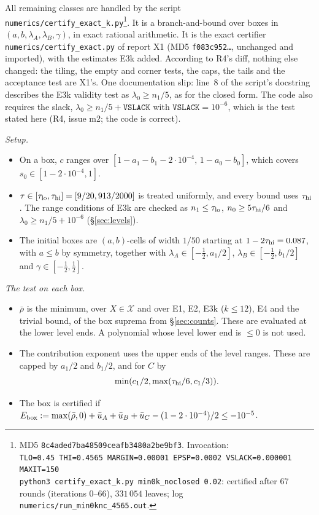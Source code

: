 \documentclass[11pt]{amsart}
\theoremstyle{definition}
\theoremstyle{remark}
\newcommand{\cX}{\mathcal{X}}
\begin{document}
All remaining classes are handled by the script\\ \texttt{numerics/certify\_exact\_k.py}\footnote{MD5 \texttt{8c4aded7ba48509ceafb3480a2be9bf3}. Invocation:\\
{\footnotesize\texttt{TLO=0.45 THI=0.4565 MARGIN=0.00001 EPSP=0.0002 VSLACK=0.000001 MAXIT=150}}\\
{\footnotesize\texttt{python3 certify\_exact\_k.py min0k\_noclosed 0.02}}: certified after 67 rounds (iterations 0--66), $331\,054$ leaves;
log \texttt{numerics/run\_min0knc\_4565.out}.}.
It is a branch-and-bound over boxes in $(a,b,\lambda_A,\lambda_B,\gamma)$, in exact rational arithmetic. It is the exact certifier
\texttt{numerics/certify\_exact.py} of report X1 (MD5 \texttt{f083c952\dots}, unchanged and imported), with the estimates E3k added.
According to R4's diff, nothing else changed: the tiling, the empty and corner tests, the caps, the tails and the acceptance test are X1's.
One documentation slip: line~8 of the script's docstring describes the E3k validity test as $\lambda_0\ge n_1/5$, as for the closed form. The
code also requires the slack, $\lambda_0\ge n_1/5+\texttt{VSLACK}$ with $\texttt{VSLACK}=10^{-6}$, which is the test stated here (R4, issue m2; the code is correct).

\emph{Setup.}
\begin{itemize}[leftmargin=*]
\item On a box, $c$ ranges over $[1-a_1-b_1-2\cdot10^{-4},\,1-a_0-b_0]$, which covers $s_0\in[1-2\cdot10^{-4},1]$.
\item $\tau\in[\tau_{\rm lo},\tau_{\rm hi}]=[9/20,913/2000]$ is treated uniformly, and every bound uses $\tau_{\rm hi}$. The range conditions of E3k are checked as
$n_1\le\tau_{\rm lo}$, $n_0\ge5\tau_{\rm hi}/6$ and $\lambda_0\ge n_1/5+10^{-6}$ (\S\ref{sec:levels}).
\item The initial boxes are $(a,b)$-cells of width $1/50$ starting at $1-2\tau_{\rm hi}=0.087$, with $a\le b$ by symmetry, together with
$\lambda_A\in[-\frac12,a_1/2]$, $\lambda_B\in[-\frac12,b_1/2]$ and $\gamma\in[-\frac12,\frac12]$.
\end{itemize}

\emph{The test on each box.}
\begin{itemize}[leftmargin=*]
\item $\bar\rho$ is the minimum, over $X\in\cX$ and over E1, E2, E3k ($k\le12$), E4 and the trivial bound, of the box suprema from \S\ref{sec:counts}. These are evaluated at the
lower level ends. A polynomial whose level lower end is $\le0$ is not used.
\item The contribution exponent uses the upper ends of the level ranges. These are capped by $a_1/2$ and $b_1/2$, and for $C$ by
\[\min(c_1/2,\max(\tau_{\rm hi}/6,c_1/3)).\]
\item The box is certified if
$E_{\rm box}:=\max(\bar\rho,0)+\bar u_A+\bar u_B+\bar u_C-(1-2\cdot10^{-4})/2\le-10^{-5}$.
\end{itemize}
\end{document}
